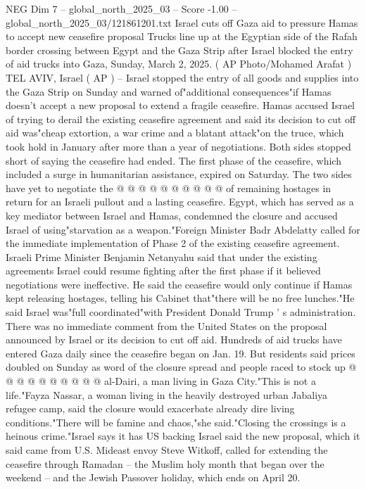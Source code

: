 \begin{textsample}{NEG Dim 7 – global\_north\_2025\_03 – Score -1.00 – global\_north\_2025\_03/121861201.txt}  \label{ex:f7_neg_136}
Israel cuts off Gaza aid to pressure Hamas to accept new ceasefire proposal Trucks line up at the Egyptian side of the Rafah border crossing between Egypt and the Gaza Strip after Israel blocked the entry of aid trucks into Gaza, Sunday, March 2, 2025. ( AP Photo/Mohamed Arafat ) TEL AVIV, Israel ( AP ) -- Israel stopped the entry of all goods and supplies into the Gaza Strip on Sunday and warned of"additional consequences"if Hamas doesn't accept a new proposal to extend a fragile ceasefire.
Hamas accused Israel of trying to derail the existing ceasefire agreement and said its decision to cut off aid was"cheap extortion, a war crime and a blatant attack"on the truce, which took hold in January after more than a year of negotiations.
Both sides stopped short of saying the ceasefire had ended.
The first phase of the ceasefire, which included a surge in humanitarian assistance, expired on Saturday.
The two sides have yet to negotiate the @ @ @ @ @ @ @ @ @ @ of remaining hostages in return for an Israeli pullout and a lasting ceasefire.
Egypt, which has served as a key mediator between Israel and Hamas, condemned the closure and accused Israel of using"starvation as a weapon."Foreign Minister Badr Abdelatty called for the immediate implementation of Phase 2 of the existing ceasefire agreement.
Israeli Prime Minister Benjamin Netanyahu said that under the existing agreements Israel could resume fighting after the first phase if it believed negotiations were ineffective.
He said the ceasefire would only continue if Hamas kept releasing hostages, telling his Cabinet that"there will be no free lunches."He said Israel was"full coordinated"with President Donald Trump ' s administration.
There was no immediate comment from the United States on the proposal announced by Israel or its decision to cut off aid.
Hundreds of aid trucks have entered Gaza daily since the ceasefire began on Jan. 19.
But residents said prices doubled on Sunday as word of the closure spread and people raced to stock up @ @ @ @ @ @ @ @ @ @ al-Dairi, a man living in Gaza City."This is not a life."Fayza Nassar, a woman living in the heavily destroyed urban Jabaliya refugee camp, said the closure would exacerbate already dire living conditions."There will be famine and chaos,"she said."Closing the crossings is a heinous crime."Israel says it has US backing Israel said the new proposal, which it said came from U.S.
Mideast envoy Steve Witkoff, called for extending the ceasefire through Ramadan -- the Muslim holy month that began over the weekend -- and the Jewish Passover holiday, which ends on April 20.

\end{textsample}
